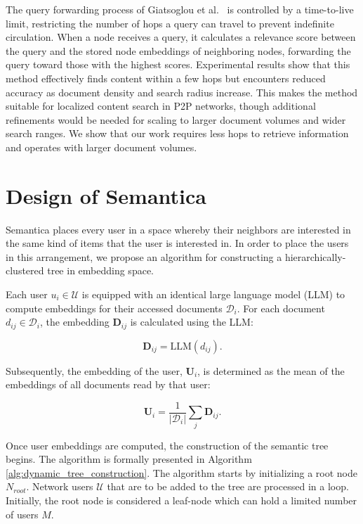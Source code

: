 \documentclass[10pt,journal]{IEEEtran}
\newcommand{\todo}[1]{\textcolor{red}{\textbf{[TODO: #1]}}}
\begin{document}
The query forwarding process of Giatsoglou et al.~\cite{giatsoglou2022graph} is controlled by a time-to-live limit, restricting the number of hops a query can travel to prevent indefinite circulation. When a node receives a query, it calculates a relevance score between the query and the stored node embeddings of neighboring nodes, forwarding the query toward those with the highest scores. Experimental results show that this method effectively finds content within a few hops but encounters reduced accuracy as document density and search radius increase. This makes the method suitable for localized content search in P2P networks, though additional refinements would be needed for scaling to larger document volumes and wider search ranges.
We show that our work requires less hops to retrieve information and operates with larger document volumes.

\section{Design of Semantica}
\label{sec:design}

Semantica places every user in a space whereby their neighbors are interested in the same kind of items that the user is interested in. In order to place the users in this arrangement, we propose an algorithm for constructing a hierarchically-clustered tree in embedding space. 

Each user $u_i \in \mathcal{U}$ is equipped with an identical large language model (LLM) to compute embeddings for their accessed documents $\mathcal{D}_i$. For each document $d_{ij} \in \mathcal{D}_i$, the embedding $\mathbf{D}_{ij}$ is calculated using the LLM:

\begin{equation}
    \mathbf{D}_{ij} = \text{LLM}(d_{ij}).
    \label{eq:document_embedding}
\end{equation}

Subsequently, the embedding of the user, $\mathbf{U}_i$, is determined as the mean of the embeddings of all documents read by that user:

\begin{equation}
    \mathbf{U}_i = \frac{1}{|\mathcal{D}_i|} \sum_{j} \mathbf{D}_{ij}.
    \label{eq:user_embedding}
\end{equation}

Once user embeddings are computed, the construction of the semantic tree begins. The algorithm is formally presented in Algorithm \ref{alg:dynamic_tree_construction}. The algorithm starts by initializing a root node $N_{root}$. Network users $\mathcal{U}$ that are to be added to the tree are processed in a %
loop.  %
Initially, the root node is considered a leaf-node which can hold a limited number of users $M$.
\end{document}
